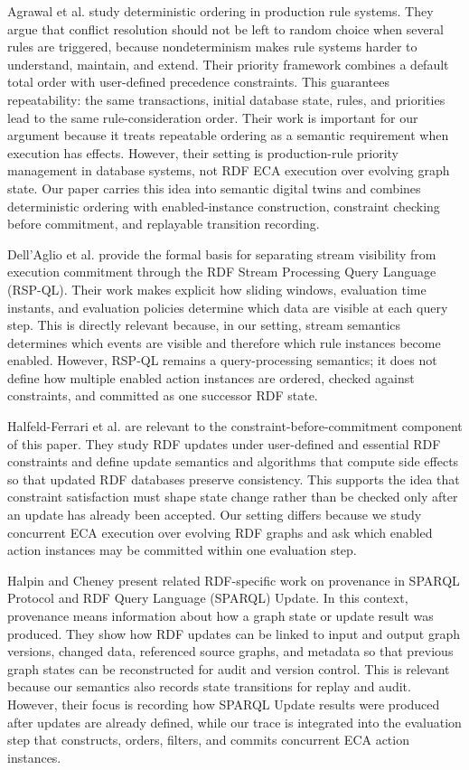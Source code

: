\documentclass{ieeeaccess}
\theoremstyle{definition}
\theoremstyle{plain}
\theoremstyle{remark}
\begin{document}
Agrawal et al. \cite{agrawal} study deterministic ordering in production rule systems. They argue that conflict resolution should not be left to random choice when several rules are triggered, because nondeterminism makes rule systems harder to understand, maintain, and extend. Their priority framework combines a default total order with user-defined precedence constraints. This guarantees repeatability: the same transactions, initial database state, rules, and priorities lead to the same rule-consideration order. Their work is important for our argument because it treats repeatable ordering as a semantic requirement when execution has effects. However, their setting is production-rule priority management in database systems, not RDF ECA execution over evolving graph state. Our paper carries this idea into semantic digital twins and combines deterministic ordering with enabled-instance construction, constraint checking before commitment, and replayable transition recording.

Dell'Aglio et al. \cite{DellAglio2014RSPQL} provide the formal basis for separating stream visibility from execution commitment through the RDF Stream Processing Query Language (RSP-QL). Their work makes explicit how sliding windows, evaluation time instants, and evaluation policies determine which data are visible at each query step. This is directly relevant because, in our setting, stream semantics determines which events are visible and therefore which rule instances become enabled. However, RSP-QL remains a query-processing semantics; it does not define how multiple enabled action instances are ordered, checked against constraints, and committed as one successor RDF state.

Halfeld-Ferrari et al. \cite{ferrari} are relevant to the constraint-before-commitment component of this paper. They study RDF updates under user-defined and essential RDF constraints and define update semantics and algorithms that compute side effects so that updated RDF databases preserve consistency. This supports the idea that constraint satisfaction must shape state change rather than be checked only after an update has already been accepted. Our setting differs because we study concurrent ECA execution over evolving RDF graphs and ask which enabled action instances may be committed within one evaluation step.

Halpin and Cheney \cite{Halpin2014SPARQLProvenance} present related RDF-specific work on provenance in SPARQL Protocol and RDF Query Language (SPARQL) Update. In this context, provenance means information about how a graph state or update result was produced. They show how RDF updates can be linked to input and output graph versions, changed data, referenced source graphs, and metadata so that previous graph states can be reconstructed for audit and version control. This is relevant because our semantics also records state transitions for replay and audit. However, their focus is recording how SPARQL Update results were produced after updates are already defined, while our trace is integrated into the evaluation step that constructs, orders, filters, and commits concurrent ECA action instances.
\end{document}
